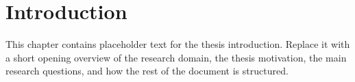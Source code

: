 \chapter{Introduction}
\label{ch::Introduction}

This chapter contains placeholder text for the thesis introduction. Replace it with a short opening overview of the research domain, the thesis motivation, the main research questions, and how the rest of the document is structured.